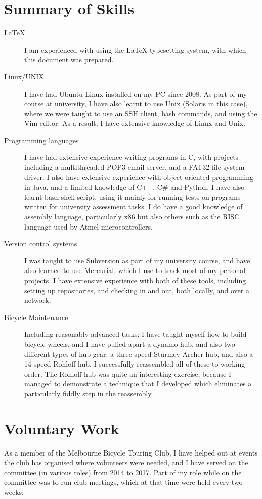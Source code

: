 \documentclass[a4paper]{article}
\begin{document}
\section{Summary of Skills}
\begin{description}
    \item[\LaTeX{}] I am experienced with using the \LaTeX{} typesetting
        system, with which this document was prepared.
    \item[Linux/UNIX] I have had Ubuntu Linux installed on my PC since
        2008. As part of my course at university, I have also learnt to
        use Unix (Solaris in this case), where we were taught to use an
        SSH client, bash commands, and using the Vim editor. As a result,
        I have extensive knowledge of Linux and Unix.
    \item[Programming languages] I have had extensive experience writing
        programs in C, with projects including a multithreaded POP3 email 
        server, and a FAT32 file system driver. I also have extensive
        experience with object oriented programming in Java, and a limited
        knowledge of C++, C\# and Python. I have also learnt
        bash shell script, using it mainly for running tests on programs
        written for university assessment tasks. I do have a good
        knowledge of assembly language, particularly x86 but also others
        such as the RISC language used by Atmel microcontrollers.
    \item[Version control systems] I was taught to use Subversion as part
        of my university course, and have also learned to use Mercurial,
        which I use to track most of my personal projects. I have extensive
        experience with both of these tools, including setting up
        repositories, and checking in and out, both locally, and over a
        network.
    \item[Bicycle Maintenance] Including reasonably advanced tasks: I have
        taught myself how to build bicycle wheels, and I have pulled
        apart a dynamo hub, and also two different types of hub gear: a
        three speed Sturmey-Archer hub, and also a 14 speed Rohloff hub.
        I successfully reassembled all of these to working order. The
        Rohloff hub was quite an interesting exercise, because I managed
        to demonstrate a technique that I developed which eliminates a
        particularly fiddly step in the reassembly.
\end{description}


\section{Voluntary Work}
As a member of the Melbourne Bicycle Touring Club, I have helped out
at events the club has organised where volunteers were needed, and I have
served on the committee (in various roles) from 2014 to 2017. Part of my
role while on the committee was to run club meetings, which at that time
were held every two weeks.
\end{document}
